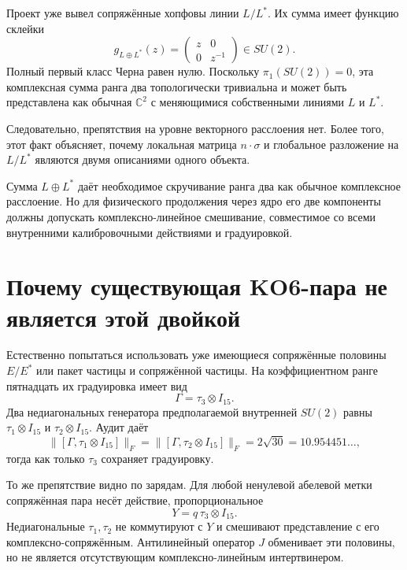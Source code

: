 Проект уже вывел сопряжённые хопфовы линии $L/L^*$. Их сумма имеет
функцию склейки
\begin{equation}
 g_{L\oplus L^*}(z)=
 \begin{pmatrix}z&0\\0&z^{-1}\end{pmatrix}
 \in SU(2).
 \label{eq:v6-hopf-pair-su2-transition}
\end{equation}
Полный первый класс Черна равен нулю. Поскольку
$\pi_1(SU(2))=0$, эта комплексная сумма ранга два топологически тривиальна
и может быть представлена как обычная $\mathbb C^2$ с меняющимися
собственными линиями $L$ и $L^*$.

Следовательно, препятствия на уровне векторного расслоения нет. Более
того, этот факт объясняет, почему локальная матрица $n\cdot\sigma$ и
глобальное разложение на $L/L^*$ являются двумя описаниями одного объекта.

\begin{proposition}
Сумма $L\oplus L^*$ даёт необходимое скручивание ранга два как обычное
комплексное расслоение. Но для физического продолжения через ядро его две
компоненты должны допускать комплексно-линейное смешивание, совместимое со
всеми внутренними калибровочными действиями и градуировкой.
\end{proposition}

\section{Почему существующая KO6-пара не является этой двойкой}

Естественно попытаться использовать уже имеющиеся сопряжённые половины
$E/E^*$ или пакет частицы и сопряжённой частицы. На коэффициентном ранге пятнадцать
их градуировка имеет вид
\begin{equation}
 \Gamma=\tau_3\otimes I_{15}.
\end{equation}
Два недиагональных генератора предполагаемой внутренней $SU(2)$ равны
$\tau_1\otimes I_{15}$ и $\tau_2\otimes I_{15}$. Аудит даёт
\begin{equation}
 \|[\Gamma,\tau_1\otimes I_{15}]\|_F
 =\|[\Gamma,\tau_2\otimes I_{15}]\|_F
 =2\sqrt{30}=10.954451\ldots,
\end{equation}
тогда как только $\tau_3$ сохраняет градуировку.

То же препятствие видно по зарядам. Для любой ненулевой абелевой метки
сопряжённая пара несёт действие, пропорциональное
\begin{equation}
 Y=q\,\tau_3\otimes I_{15}.
\end{equation}
Недиагональные $\tau_1,\tau_2$ не коммутируют с $Y$ и смешивают
представление с его комплексно-сопряжённым. Антилинейный оператор $J$
обменивает эти половины, но не является отсутствующим комплексно-линейным
интертвинером.

